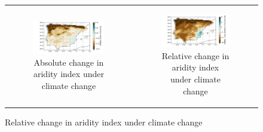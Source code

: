 \begin{figure}[htbp]
    \centering
    \begin{tabular}{cc}
        \begin{subfigure}[b]{0.5\textwidth}
            \caption{Absolute change in aridity index under climate change}
            \includegraphics[width=\textwidth]{images/chap4/future/diffmap_aridity_index_presfut.png}
        \end{subfigure} &
        \begin{subfigure}[b]{0.5\textwidth}
            \caption{Relative change in aridity index under climate change}
            \includegraphics[width=\textwidth]{images/chap4/future/reldiffmap_aridity_index_presfut.png}
        \end{subfigure} \\


\end{tabular}
\end{figure}
